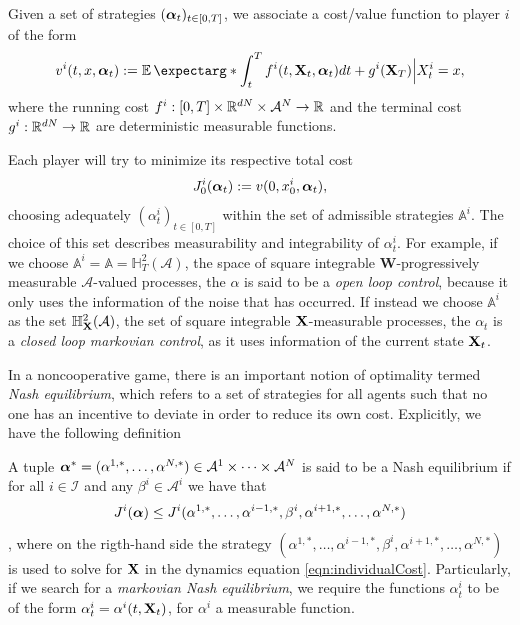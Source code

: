 Given a set of strategies $(\bm{\alpha}_t)_{t\in [0,T]}$, we associate a cost/value function to player $i$ of the form
\begin{equation}
	\label{eqn:individualCost}
	v^i(t,x,\bfAlp_t):=\expect*{\int_{t}^{T}f^i(t,\bfX_t,\bfAlp_t)dt +g^i(\bfX_T)\Big| X_t^i=x},
\end{equation}
where the running cost $f^i:[0,T]\times \mathbb{R}^{dN}\times \mathcal{A}^N\to \mathbb{R}$ and the terminal cost $g^i:\mathbb{R}^{dN}\to \mathbb{R}$ are deterministic measurable functions.

Each player will try to minimize its respective total cost
\begin{equation}
	\label{eqn:total_cost}
	J^i_0(\bm{\alpha}_t):=v(0,x^i_0,\bm{\alpha}_t),
\end{equation}  choosing adequately $(\alpha^{i}_t)_{t\in[0,T]}$ within the set of admissible strategies $\mathbb{A}^i$. The choice of this set describes measurability and integrability of $\alpha_t^i$. For example, if we choose $\mathbb{A}^i=\mathbb{A}=\mathbb{H}^2_T(\mathcal{A})$, the space of square integrable $\bm{W}$-progressively measurable $\mathcal{A}$-valued processes, the $\alpha$ is said to be a \textit{open loop control}, because it only uses the information of the noise that has occurred. If instead we choose $\mathbb{A}^i$ as the set $\mathbb{H}_{\mathbf{X}}^2(\mathcal{A})$, the set of square integrable  $\mathbf{X}$-measurable processes, the $\alpha_t$ is a \textit{closed loop markovian control}, as it uses information of the current state $\mathbf{X}_t$.

In a noncooperative game, there is an important notion of optimality termed \textit{Nash equilibrium}, which refers to a set of strategies for all agents such that no one has an incentive to deviate in order to reduce its own cost. Explicitly, we have the following definition
\begin{definition}
A tuple $\bm{\alpha}^*=(\alpha^{1,*},\ldots,\alpha^{N,*})\in \mathcal{A}^1\times \cdots \times \mathcal{A}^N$ is said to be a Nash equilibrium if for all $i\in\mathcal{I}$ and any $\beta^i\in\mathcal{A}^i$ we have that
 $$J^{i}(\bm{\alpha})\leq J^i(\alpha^{1,*},\ldots,\alpha^{i-1,*},\beta^i,\alpha^{i+1,*},\ldots ,\alpha^{N,*})$$,
 where on the rigth-hand side the strategy $(\alpha^{1,*},\ldots,\alpha^{i-1,*},\beta^i,\alpha^{i+1,*},\ldots ,\alpha^{N,*})$ is used to solve for $\mathbf{X}$ in the dynamics equation \eqref{eqn:individualCost}. Particularly, if we search for a \textit{markovian Nash equilibrium}, we require the functions $\alpha^i_t$ to be of the form $\alpha^i_t=\alpha^i(t,\mathbf{X}_t)$, for $\alpha^i$ a measurable function.  
\end{definition}

